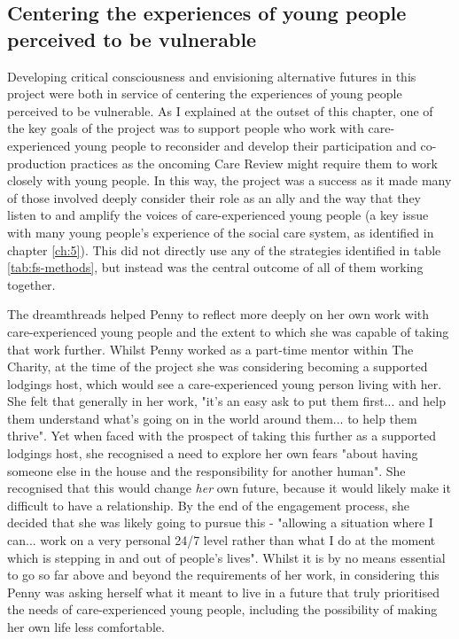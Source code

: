 \subsection{Centering the experiences of young people perceived to be vulnerable}
Developing critical consciousness and envisioning alternative futures in this project were both in service of centering the experiences of young people perceived to be vulnerable. As I explained at the outset of this chapter, one of the key goals of the project was to support people who work with care-experienced young people to reconsider and develop their participation and co-production practices as the oncoming Care Review might require them to work closely with young people. In this way, the project was a success as it made many of those involved deeply consider their role as an ally and the way that they listen to and amplify the voices of care-experienced young people (a key issue with many young people's experience of the social care system, as identified in chapter \ref{ch:5}). This did not directly use any of the strategies identified in table \ref{tab:fs-methods}, but instead was the central outcome of all of them working together. 

The dreamthreads helped Penny to reflect more deeply on her own work with care-experienced young people and the extent to which she was capable of taking that work further. Whilst Penny worked as a part-time mentor within The Charity, at the time of the project she was considering becoming a supported lodgings host, which would see a care-experienced young person living with her. She felt that generally in her work, "it's an easy ask to put them first... and help them understand what's going on in the world around them... to help them thrive". Yet when faced with the prospect of taking this further as a supported lodgings host, she recognised a need to explore her own fears "about having someone else in the house and the responsibility for another human". She recognised that this would change \textit{her} own future, because it would likely make it difficult to have a relationship. By the end of the engagement process, she decided that she was likely going to pursue this - "allowing a situation where I can... work on a very personal 24/7 level rather than what I do at the moment which is stepping in and out of people's lives". Whilst it is by no means essential to go so far above and beyond the requirements of her work, in considering this Penny was asking herself what it meant to live in a future that truly prioritised the needs of care-experienced young people, including the possibility of making her own life less comfortable.

